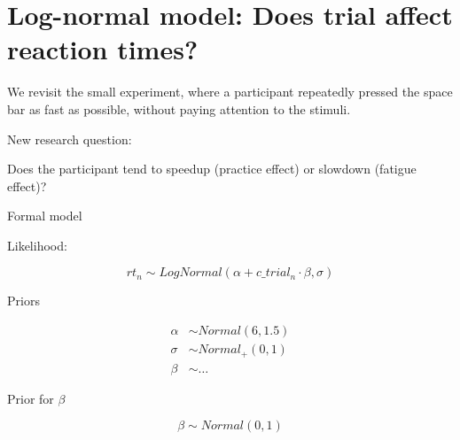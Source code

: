 \documentclass[12pt,ignorenonframetext,aspectratio=169]{beamer}
\begin{document}
\hypertarget{sec:trial}{%
\section{Log-normal model: Does trial affect reaction times?}\label{sec:trial}}

\begin{frame}

We revisit the small experiment, where a participant repeatedly pressed the space bar as fast as possible, without paying attention to the stimuli.

\begin{block}{New research question:}

Does the participant tend to speedup (practice effect) or slowdown (fatigue effect)?

\end{block}

\end{frame}

\begin{frame}{Formal model}
\protect\hypertarget{formal-model-1}{}

\begin{block}{Likelihood:}

\begin{equation}
rt_n \sim LogNormal(\alpha + c\_trial_n \cdot \beta,\sigma)
\label{eq:rtloglik}
\end{equation}

\end{block}

\begin{block}{Priors}

\begin{equation}
\begin{aligned}
\alpha &\sim Normal(6, 1.5) \\
\sigma &\sim Normal_+(0, 1)\\
\beta &\sim \ldots
\end{aligned}
\end{equation}

\end{block}

\end{frame}

\begin{frame}{Prior for \(\beta\)}
\protect\hypertarget{prior-for-beta-1}{}

\begin{equation}
\beta \sim Normal(0, 1)
\end{equation}

\end{frame}
\end{document}
